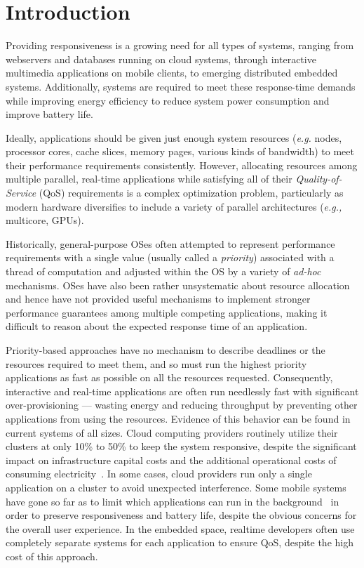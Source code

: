 \section{Introduction}

Providing responsiveness is a growing need for all types of systems,
ranging from webservers and databases running on cloud systems,
through interactive multimedia applications on mobile clients, to
emerging distributed embedded systems. Additionally, systems are
required to meet these response-time demands while improving energy
efficiency to reduce system power consumption and improve battery
life.

Ideally, applications should be given just enough system resources
(\emph{e.g.}  nodes, processor cores, cache slices, memory pages,
various kinds of bandwidth) to meet their performance requirements
consistently.  However, allocating resources among multiple parallel,
real-time applications while satisfying all of their
\emph{Quality-of-Service} (QoS) requirements is a complex optimization
problem, particularly as modern hardware diversifies to include a
variety of parallel architectures (\emph{e.g.,} multicore, GPUs).

Historically, general-purpose OSes often attempted to represent performance
requirements with a single value (usually called a \emph{priority})
associated with a thread of computation and adjusted within the OS by
a variety of \emph{ad-hoc} mechanisms.  OSes have also been rather
unsystematic about resource allocation and hence have not provided
useful mechanisms to implement stronger performance guarantees among
multiple competing applications, making it difficult to reason about
the expected response time of an application.

Priority-based approaches have no mechanism to describe deadlines or
the resources required to meet them, and so must run the highest
priority applications as fast as possible on all the resources
requested.  Consequently, interactive and real-time applications are
often run needlessly fast with significant over-provisioning ---
wasting energy and reducing throughput by preventing other
applications from using the resources.  Evidence of this behavior can
be found in current systems of all sizes.  Cloud computing providers
routinely utilize their clusters at only 10\% to 50\% to keep the
system responsive, despite the significant impact on infrastructure
capital costs and the additional operational costs of consuming
electricity~\cite{Barroso2009,Hennessy2011}.  In some cases, cloud
providers run only a single application on a cluster to avoid
unexpected interference.  Some mobile systems have gone so far as to
limit which applications can run in the background~\cite{iOsDev} in
order to preserve responsiveness and battery life, despite the obvious
concerns for the overall user experience.  In the embedded space,
realtime developers often use completely separate systems for each
application to ensure QoS, despite the high cost of this approach.

